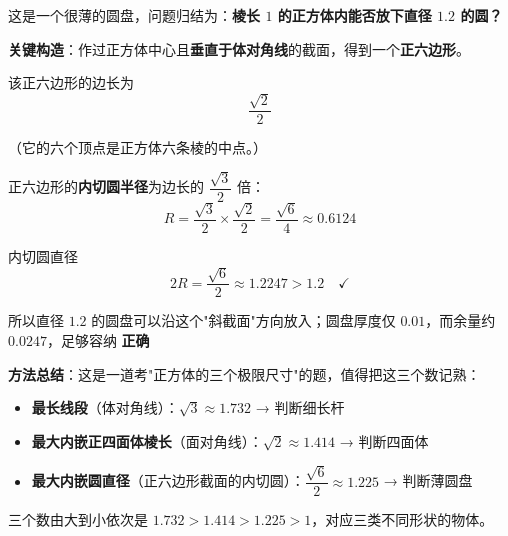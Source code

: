 \begin{answer}
这是一个很薄的圆盘，问题归结为：\textbf{棱长 $1$ 的正方体内能否放下直径 $1.2$ 的圆？}

\textbf{关键构造}：作过正方体中心且\textbf{垂直于体对角线}的截面，得到一个\textbf{正六边形}。

该正六边形的边长为
\nopagebreak[4]
\[\frac{\sqrt2}2\]

（它的六个顶点是正方体六条棱的中点。）

正六边形的\textbf{内切圆半径}为边长的 $\dfrac{\sqrt3}2$ 倍：
\nopagebreak[4]
\[R=\frac{\sqrt3}2\times\frac{\sqrt2}2=\frac{\sqrt6}4\approx0.6124\]

内切圆直径
\nopagebreak[4]
\[2R=\frac{\sqrt6}2\approx1.2247>1.2\quad\checkmark\]

所以直径 $1.2$ 的圆盘可以沿这个"斜截面"方向放入；圆盘厚度仅 $0.01$，而余量约 $0.0247$，足够容纳  \textbf{正确}

\begin{gktip}
\textbf{方法总结}：这是一道考"正方体的三个极限尺寸"的题，值得把这三个数记熟：
\begin{itemize}
\item \textbf{最长线段}（体对角线）：$\sqrt3\approx1.732$ → 判断细长杆
\item \textbf{最大内嵌正四面体棱长}（面对角线）：$\sqrt2\approx1.414$ → 判断四面体
\item \textbf{最大内嵌圆直径}（正六边形截面的内切圆）：$\dfrac{\sqrt6}2\approx1.225$ → 判断薄圆盘
\end{itemize}

三个数由大到小依次是 $1.732>1.414>1.225>1$，对应三类不同形状的物体。
\end{gktip}


\par\medskip

\end{answer}

